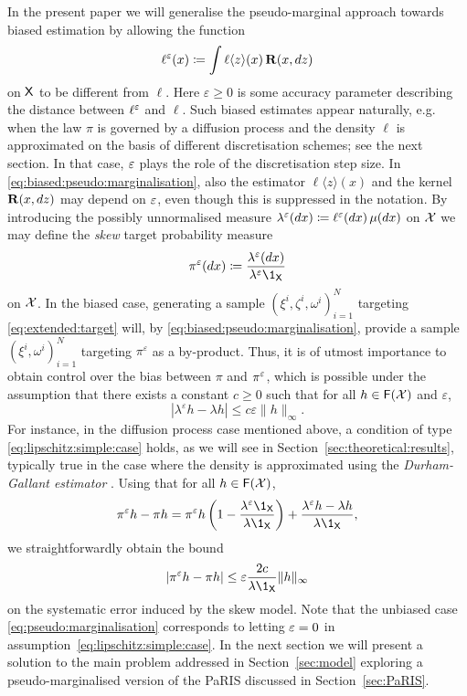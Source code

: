 In the present paper we will generalise the pseudo-marginal approach towards biased estimation by allowing the function 
\begin{equation} \label{eq:biased:pseudo:marginalisation}
    \ell^\precpar(x) \eqdef \int \ell \langle z \rangle(x) \, \mathbf{R}(x, \rmd z)
\end{equation}
on $\mathsf{X}$ to be different from $\ell$. Here $\varepsilon \geq 0$ is some accuracy parameter describing the distance between $\ell^\varepsilon$ and $\ell$. Such biased estimates appear naturally, e.g. when the law $\pi$ is governed by a diffusion process and the density $\ell$ is approximated on the basis of different discretisation schemes; see the next section. In that case, $\varepsilon$ plays the role of the discretisation step size. In \eqref{eq:biased:pseudo:marginalisation}, also the estimator $\ell \langle z \rangle(x)$ and the kernel $\mathbf{R}(x, d z)$ may depend on $\varepsilon$, even though this is suppressed in the notation. By introducing the possibly unnormalised measure $\lambda^\varepsilon(d x) \coloneqq \ell^\varepsilon(d x) \, \mu(d x)$ on $\mathcal{X}$ we may define the \emph{skew} target probability measure
$$
    \pi^\varepsilon(\rmd x) \eqdef \frac{\lambda^\precpar(\rmd x)}{\lambda^\precpar \1_\Xset}
$$
on $\mathcal{X}$. In the biased case, generating a sample $(\xi^i, \zeta^i, \omega^i)_{i = 1}^N$ targeting \eqref{eq:extended:target} will, by \eqref{eq:biased:pseudo:marginalisation}, provide a sample $(\xi^i, \omega^i)_{i = 1}^N$ targeting $\pi^\varepsilon$ as a by-product. Thus, it is of utmost importance to obtain control over the bias between $\pi$ and $\pi^\varepsilon$, which is possible under the assumption that there exists a constant $c \geq 0$ such that for all $h \in \mathsf{F}(\mathcal{X})$ and $\varepsilon$,   
\begin{equation} \label{eq:lipschitz:simple:case}
    \left| \lambda^\varepsilon h - \lambda h \right| \leq c \varepsilon \| h \|_\infty. 
\end{equation}
For instance, in the diffusion process case mentioned above, a condition of type \eqref{eq:lipschitz:simple:case} holds, as we will see in Section~\ref{sec:theoretical:results}, typically true in the case where the density is approximated using the \emph{Durham-Gallant estimator} \cite{durham:gallant:2002}. Using that for all $h \in \mathsf{F}(\mathcal{X})$,  
$$
    \pi^\precpar h - \pi h = \pi^\precpar h \left( 1 - \frac{\lambda^\varepsilon \1_\Xset}{\lambda \1_\Xset} \right) + \frac{\lambda^\precpar h - \lambda h}{\lambda \1_\Xset}, 
$$
we straightforwardly obtain the bound  
$$
    \left| \pi^\precpar h - \pi h \right| \leq \precpar \frac{2 c}{\lambda \1_\Xset} \| h \|_\infty
$$
on the systematic error induced by the skew model. Note that the unbiased case \eqref{eq:pseudo:marginalisation} corresponds to letting $\varepsilon = 0$ in assumption~\eqref{eq:lipschitz:simple:case}. In the next section we will present a solution to the main problem addressed in Section~\ref{sec:model} exploring a pseudo-marginalised version of the PaRIS discussed in Section~\ref{sec:PaRIS}. 

